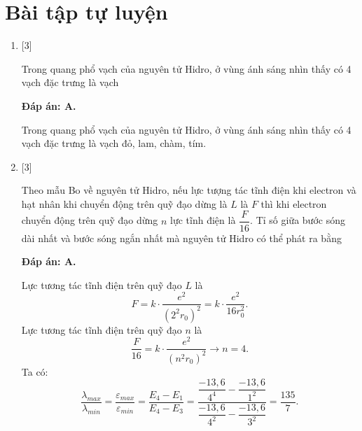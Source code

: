 \section{Bài tập tự luyện}
\begin{enumerate}[label=\bfseries Câu \arabic*:]
	
	\item {} [3]
		\cauhoi
	{Trong quang phổ vạch của nguyên tử Hidro, ở vùng ánh sáng nhìn thấy có 4 vạch đặc trưng là vạch
	}
	
	\loigiai
	{		\textbf{Đáp án: A.}
		
		Trong quang phổ vạch của nguyên tử Hidro, ở vùng ánh sáng nhìn thấy có 4 vạch đặc trưng là vạch đỏ, lam, chàm, tím.
	}
	
	\item {} [3]
		\cauhoi
	{Theo mẫu Bo về nguyên tử Hidro, nếu lực tượng tác tĩnh điện khi electron và hạt nhân khi chuyển động trên quỹ đạo dừng là $ L $ là $ F $ thì khi electron chuyển động trên quỹ đạo dừng $ n $ lực tĩnh điện là $ \dfrac{F}{16} $. Tỉ số giữa bước sóng dài nhất và bước sóng ngắn nhất mà nguyên tử Hidro có thể phát ra bằng
	}
	
	\loigiai
	{		\textbf{Đáp án: A.}
		
		Lực tương tác tĩnh điện trên quỹ đạo $ L $ là
		$$
		F = k \cdot \dfrac{e^{2}}{\left( 2^{2} r_{0} \right)^2} = k \cdot \dfrac{e^{2}}{16 r_{0}^{2}}.
		$$
		Lực tương tác tĩnh điện trên quỹ đạo $ n $ là
		$$
		\dfrac{F}{16} = k \cdot \dfrac{e^{2}}{\left( n^{2} r_{0} \right)^2} \rightarrow n = \num{4}.
		$$
		Ta có:
		$$
		\dfrac{\lambda_{max}}{\lambda_{min}} = \dfrac{\varepsilon_{max}}{\varepsilon_{min}} = \dfrac{E_{4} - E_{1}}{E_{4} - E_{3}} = \dfrac{\dfrac{-13,6}{4^{4}} - \dfrac{-13,6}{1^{2}}}{\dfrac{-13,6}{4^{2}} - \dfrac{-13,6}{3^{2}}} = \dfrac{135}{7}.
		$$
	}
	

\end{enumerate}
